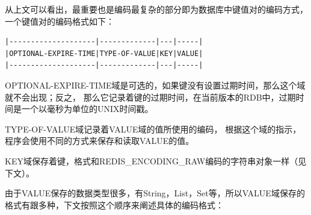 \documentclass{zjutthesis}
\begin{document}
从上文可以看出，最重要也是编码最复杂的部分即为数据库中键值对的编码方式，一个键值对的编码格式如下：
\begin{verbatim}
|--------------------|-------------|---|-----|
|OPTIONAL-EXPIRE-TIME|TYPE-OF-VALUE|KEY|VALUE|
|--------------------|-------------|---|-----|
\end{verbatim}
OPTIONAL-EXPIRE-TIME域是可选的，如果键没有设置过期时间，那么这个域就不会出现；反之，
那么它记录着键的过期时间，在当前版本的RDB中，过期时间是一个以毫秒为单位的UNIX时间戳。

TYPE-OF-VALUE域记录着VALUE域的值所使用的编码，
根据这个域的指示，程序会使用不同的方式来保存和读取VALUE的值。

KEY域保存着键，格式和REDIS\_ENCODING\_RAW编码的字符串对象一样（见下文）。

由于VALUE保存的数据类型很多，有String，List，Set等，所以VALUE域保存的格式有跟多种，下文按照这个顺序来阐述具体的编码格式：
\end{document}
